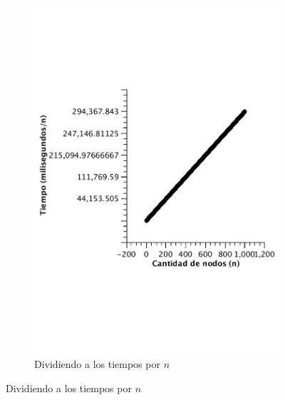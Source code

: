 \begin{figure}[H]
        \begin{subfigure}[b]{0.5\textwidth}
                \includegraphics[width=\textwidth]{imagenes/completo-listas-2.pdf}
                \caption{Dividiendo a los tiempos por $n$}
        \end{subfigure}
\end{figure}

